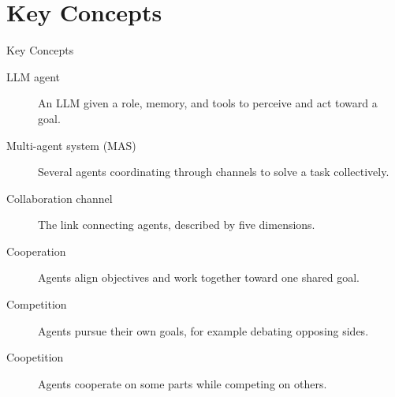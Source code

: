 \documentclass[10pt]{beamer}
\begin{document}
\section{Key Concepts}
\begin{frame}[allowframebreaks]{Key Concepts}
  \begin{description}
    \item[LLM agent] An LLM given a role, memory, and tools to perceive and act toward a goal.
    \item[Multi-agent system (MAS)] Several agents coordinating through channels to solve a task collectively.
    \item[Collaboration channel] The link connecting agents, described by five dimensions.
    \item[Cooperation] Agents align objectives and work together toward one shared goal.
    \item[Competition] Agents pursue their own goals, for example debating opposing sides.
    \item[Coopetition] Agents cooperate on some parts while competing on others.
  \end{description}
\end{frame}
\end{document}
